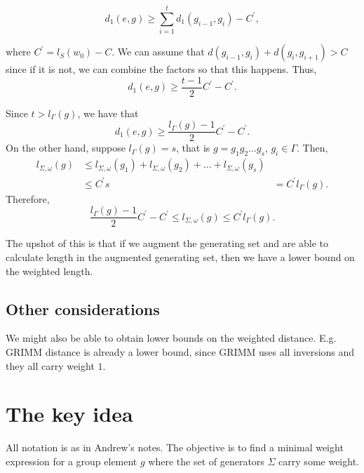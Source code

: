 \documentclass{article}
\begin{document}
\[d_1(e,g) \geq \sum_{i=1}^{t}{d_1(g_{i-1},g_i)} - C^{\prime},\]

where $C^{\prime}=l_S(w_0) -C$. We can assume that $d(g_{i-1},g_i)+d(g_i,g_{i+1}) > C$ since if it is not, we can combine the factors so that this happens. Thus,
\[d_1(e,g) \geq \frac{t-1}{2}C^{\prime} - C^{\prime}.\]

Since $t > l_{\Gamma}(g)$, we have that
\[d_1(e,g) \geq \frac{l_{\Gamma}(g)-1}{2}C^{\prime} - C^{\prime}.\]
On the other hand, suppose $l_{\Gamma}(g)=s$, that is $g=g_1g_2 \hdots g_s$, $g_i \in \Gamma$. Then,
\begin{align*}
l_{\Sigma,\omega}(g) &\leq l_{\Sigma,\omega}(g_1) + l_{\Sigma,\omega}(g_2) + \hdots + l_{\Sigma,\omega}(g_s) \\
& \leq C^{\prime} s
& = C^{\prime} l_{\Gamma}(g).
\end{align*}
Therefore, \[\frac{l_{\Gamma}(g)-1}{2}C^{\prime} - C^{\prime} \leq l_{\Sigma,\omega}(g) \leq C^{\prime} l_{\Gamma}(g).\]

The upshot of this is that if we augment the generating set and are able to calculate length in the augmented generating set, then we have a lower bound on the weighted length. 
\subsection{Other considerations}
 
 We might also be able to obtain lower bounds on the weighted distance. E.g. GRIMM distance is already a lower bound, since GRIMM uses all inversions and they all carry weight $1$.
\section{The key idea}
All notation is as in Andrew's notes.
The objective is to find a minimal weight expression for a group element $g$ where the set of generators $\Sigma$ carry some weight. 
\end{document}
